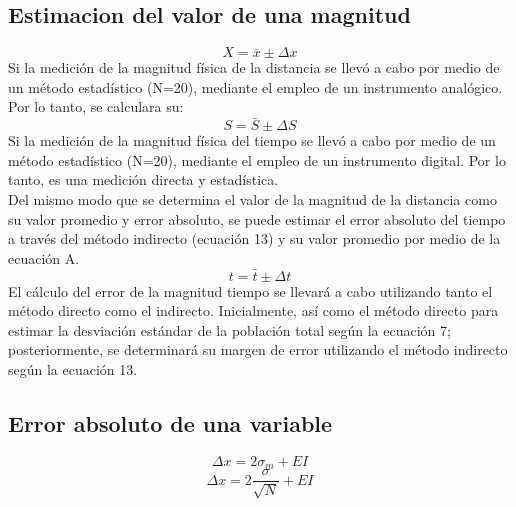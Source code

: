 \documentclass[runningheads]{llncs}
\begin{document}
    \subsection*{Estimacion del valor de una magnitud}
    \begin{equation}
        X=\bar{x}\pm \Delta x
    \end{equation}
    Si la medición de la magnitud física de la distancia se llevó a cabo por medio de un método estadístico (N=20), mediante el empleo de un instrumento analógico. Por lo tanto, se calculara su:
    \begin{equation}
        S=\bar{S}\pm \Delta S
    \end{equation}
    Si la medición de la magnitud física del tiempo se llevó a cabo por medio de un método estadístico (N=20), mediante el empleo de un instrumento digital. Por lo tanto, es una medición directa y estadística. \\
    Del mismo modo que se determina el valor de la magnitud de la distancia como su valor promedio y error absoluto, se puede estimar el error absoluto del tiempo a través del método indirecto (ecuación 13) y su valor promedio por medio de la ecuación A.\\
    \begin{equation}
        t=\bar{t}\pm \Delta t
    \end{equation}
    El cálculo del error de la magnitud tiempo se llevará a cabo utilizando tanto el método directo como el indirecto. Inicialmente, así como el método directo para estimar la desviación estándar de la población total según la ecuación 7; posteriormente, se determinará su margen de error utilizando el método indirecto según la ecuación 13.\\
    \subsection*{Error absoluto de una variable}
    \begin{equation}
        \Delta x=2\sigma_{m}+EI
    \end{equation}
    \begin{equation}
        \Delta x=2\frac{\sigma}{\sqrt{N}}+EI
    \end{equation}
\end{document}
